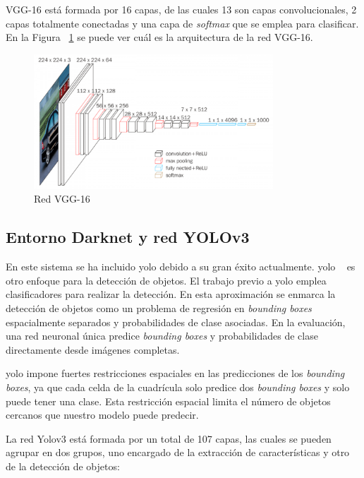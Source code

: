 VGG-16  está formada por 16 capas, de las cuales 13 son capas convolucionales, 2 capas totalmente conectadas y una capa de \textit{softmax} que se emplea para clasificar. En la Figura ~\ref{fig.vgg16} se puede ver cuál es la arquitectura de la red VGG-16.

 \begin{figure}[H] 
\begin{center}
	\includegraphics[width=0.8\textwidth]{figures/Diseno_global/vgg16.png}
   \caption{Red VGG-16}
	\label{fig.vgg16}
\end{center}
\end{figure}

\subsection{Entorno Darknet y red YOLOv3}\label{sub.darknet}

En este sistema se ha incluido \acrfull{yolo} debido a su gran éxito actualmente. \acrshort{yolo} ~\cite{yolo_article1} es otro enfoque para la detección de objetos. El trabajo previo a \acrshort{yolo} emplea clasificadores para realizar la detección. En esta aproximación se enmarca la detección de objetos como un problema de regresión en \textit{bounding boxes} espacialmente separados y probabilidades de clase asociadas. En la evaluación, una red neuronal única predice \textit{bounding boxes} y probabilidades de clase directamente desde imágenes completas. 

\acrshort{yolo} impone fuertes restricciones espaciales en las predicciones de los \textit{bounding boxes}, ya que cada celda de la cuadrícula solo predice dos \textit{bounding boxes} y solo puede tener una clase. Esta restricción espacial limita el número de objetos cercanos que nuestro modelo puede predecir. 

La red Yolov3 está formada por un total de 107 capas,  las cuales se pueden agrupar en dos grupos, uno encargado de la extracción de características y otro de la detección de objetos:

